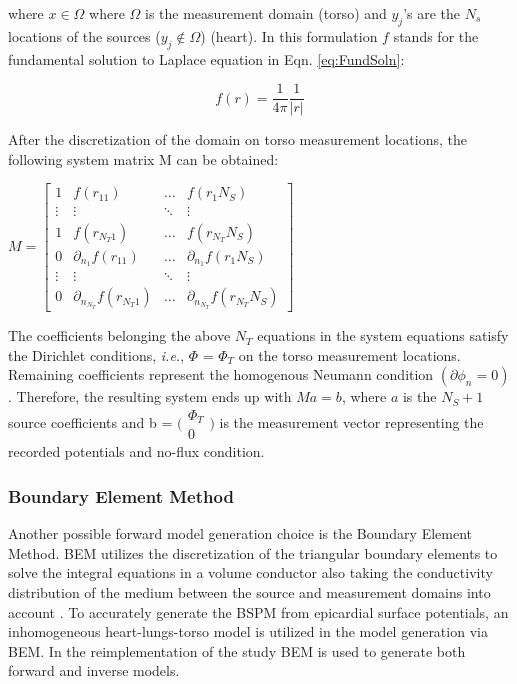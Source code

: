 \documentclass[draftcls, onecolumn, journal]{IEEEtran}
\begin{document}
where $x \in \Omega$ where $\Omega$ is the measurement domain (torso) and $y_j$'s are the $N_s$ locations of the sources ($y_j \notin \Omega$) (heart). In this formulation $f$ stands for the fundamental solution to Laplace equation in Eqn. \eqref{eq:FundSoln}:

\begin{equation}
    f(r) = \frac{1}{4\pi} \frac{1}{|r|}
    \label{eq:FundSoln}
\end{equation}

After the discretization of the domain on torso measurement locations, the following system matrix M can be obtained:

\begin{center}
    $M = \begin{bmatrix} 
        1 & f(r_{11}) & \dots & f(r_1 N_S) \\
        \vdots & \vdots  & \ddots & \vdots\\
        1 &  f(r_{N_T1}) & \dots & f(r_{N_T} N_S) \\ 
        0 & \partial_{n_1}f(r_{11}) & \dots & \partial_{n_1}f(r_1 N_S) \\
        \vdots & \vdots  & \ddots & \vdots\\
        0 &  \partial_{n_{N_T}}f(r_{N_T1}) & \dots & \partial_{n_{N_T}}f(r_{N_T} N_S)     
        \end{bmatrix}$    
\end{center}

The coefficients belonging the above $N_T$ equations in the system equations satisfy the Dirichlet conditions, \textit{i.e.}, $\Phi$ = $\Phi_{T}$ on the torso measurement locations. Remaining coefficients represent the homogenous Neumann condition $(\partial \phi_n = 0)$. Therefore, the resulting system ends up with $Ma = b$, where $a$ is the $N_S + 1$ source coefficients and b = $\big(\begin{smallmatrix}
    \Phi_T \\
    0 
  \end{smallmatrix}\big)$  is the measurement vector representing the recorded potentials and no-flux condition. 

\subsubsection{Boundary Element Method}

Another possible forward model generation choice is the Boundary Element Method. BEM utilizes the discretization of the triangular boundary elements to solve the integral equations in a volume conductor also taking the conductivity distribution of the medium between the source and measurement domains into account \cite*{4536071}. To accurately generate the BSPM from epicardial surface potentials, an inhomogeneous heart-lungs-torso model is utilized in the model generation via BEM. In the reimplementation of the study BEM is used to generate both forward and inverse models. 
\end{document}
